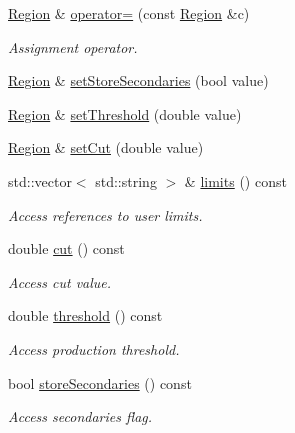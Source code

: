 \begin{DoxyCompactItemize}
\hyperlink{class_d_d4hep_1_1_geometry_1_1_region}{Region} \& \hyperlink{class_d_d4hep_1_1_geometry_1_1_region_acd0e2208ce7854c4dead0764782cace9}{operator=} (const \hyperlink{class_d_d4hep_1_1_geometry_1_1_region}{Region} \&c)
\begin{DoxyCompactList}\small\item\em Assignment operator. \end{DoxyCompactList}\item 
\hyperlink{class_d_d4hep_1_1_geometry_1_1_region}{Region} \& \hyperlink{class_d_d4hep_1_1_geometry_1_1_region_a491be77e5c4a5098fa1ae6acb8fac442}{set\+Store\+Secondaries} (bool value)
\item 
\hyperlink{class_d_d4hep_1_1_geometry_1_1_region}{Region} \& \hyperlink{class_d_d4hep_1_1_geometry_1_1_region_a29293fa51db7f4469c51a7638a77043a}{set\+Threshold} (double value)
\item 
\hyperlink{class_d_d4hep_1_1_geometry_1_1_region}{Region} \& \hyperlink{class_d_d4hep_1_1_geometry_1_1_region_ae4510bd7a92f89b49d161c67475c0350}{set\+Cut} (double value)
\item 
std\+::vector$<$ std\+::string $>$ \& \hyperlink{class_d_d4hep_1_1_geometry_1_1_region_a9aa3963529a3eec97d64390478a190c8}{limits} () const
\begin{DoxyCompactList}\small\item\em Access references to user limits. \end{DoxyCompactList}\item 
double \hyperlink{class_d_d4hep_1_1_geometry_1_1_region_a2bb062861e634298019cec364dc03342}{cut} () const
\begin{DoxyCompactList}\small\item\em Access cut value. \end{DoxyCompactList}\item 
double \hyperlink{class_d_d4hep_1_1_geometry_1_1_region_ab1320c514927b9a775a31cec3c8c7cf3}{threshold} () const
\begin{DoxyCompactList}\small\item\em Access production threshold. \end{DoxyCompactList}\item 
bool \hyperlink{class_d_d4hep_1_1_geometry_1_1_region_a9e87910102de676ba08f9bbfc6cec063}{store\+Secondaries} () const
\begin{DoxyCompactList}\small\item\em Access secondaries flag. \end{DoxyCompactList}\end{DoxyCompactItemize}
